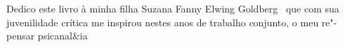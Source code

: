  

Dedico este livro à minha filha Suzana Fanny Elwing Goldberg~ que com
sua juvenilidade crítica me inspirou nestes anos de trabalho conjunto, o
meu re"-pensar psicanal\&ia
